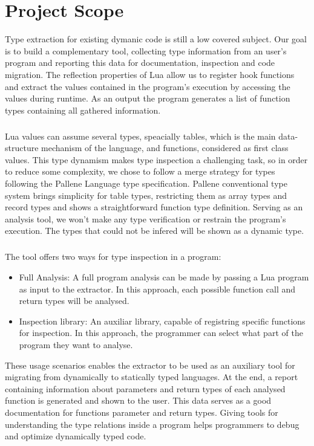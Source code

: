 
\chapter{Project Scope}
\label{cha:Project Scope}
Type extraction for existing dymanic code is still a low covered subject. Our goal is to build a complementary tool, collecting type information from an user's program and reporting this data for documentation, inspection and code migration. The reflection properties of Lua allow us to register hook functions and extract the values contained in the program's execution by accessing the values during runtime. As an output the program generates a list of function types containing all gathered information.
\paragraph*{}
Lua values can assume several types, speacially tables, which is the main data-structure mechanism of the language, and functions, considered as first class values. This type dynamism makes type inspection a challenging task, so in order to reduce some complexity, we chose to follow a merge strategy for types following the Pallene Language type specification. Pallene conventional type system brings simplicity for table types, restricting them as array types and record types and shows a straightforward function type definition. Serving as an analysis tool, we won't make any type verification or restrain the program's execution. The types that could not be infered will be shown as a dynamic type.
\paragraph*{}
The tool offers two ways for type inspection in a program:
\begin{itemize}
    \item{Full Analysis:} A full program analysis can be made by passing a Lua program as input to the extractor. In this approach, each possible function call and return types will be analysed.
    \item{Inspection library:} An auxiliar library, capable of registring specific functions for inspection. In this approach, the programmer can select what part of the program they want to analyse.
\end{itemize}
 These usage scenarios enables the extractor to be used as an auxiliary tool for migrating from dynamically to statically typed languages. At the end, a report containing information about parameters and return types of each analysed function is generated and shown to the user. This data serves as a good documentation for functions parameter and return types. Giving tools for understanding the type relations inside a program helps programmers to debug and optimize dynamically typed code.



